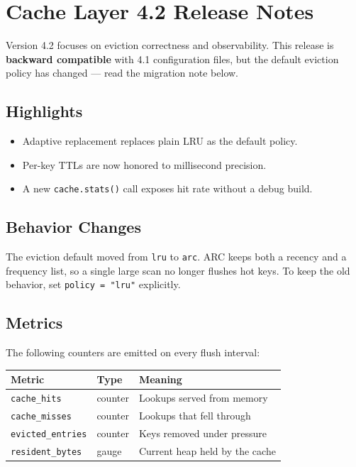 \documentclass[
]{article}
\author{}
\date{}
\newcounter{none} %
\providecommand{\tightlist}{%
  \setlength{\itemsep}{0pt}\setlength{\parskip}{0pt}}
\begin{document}
\section{Cache Layer 4.2 Release
Notes}\label{cache-layer-4.2-release-notes}

Version 4.2 focuses on eviction correctness and observability. This
release is \textbf{backward compatible} with 4.1 configuration files,
but the default eviction policy has changed --- read the migration note
below.

\subsection{Highlights}\label{highlights}

\begin{itemize}
\tightlist
\item
  Adaptive replacement replaces plain LRU as the default policy.
\item
  Per-key TTLs are now honored to millisecond precision.
\item
  A new \texttt{cache.stats()} call exposes hit rate without a debug
  build.
\end{itemize}

\subsection{Behavior Changes}\label{behavior-changes}

The eviction default moved from \texttt{lru} to \texttt{arc}. ARC keeps
both a recency and a frequency list, so a single large scan no longer
flushes hot keys. To keep the old behavior, set
\texttt{policy\ =\ "lru"} explicitly.

\subsection{Metrics}\label{metrics}

The following counters are emitted on every flush interval:

{\def\LTcaptype{none} %
\begin{longtable}[]{@{}lll@{}}
\toprule\noalign{}
Metric & Type & Meaning \\
\midrule\noalign{}
\endhead
\bottomrule\noalign{}
\endlastfoot
\texttt{cache\_hits} & counter & Lookups served from memory \\
\texttt{cache\_misses} & counter & Lookups that fell through \\
\texttt{evicted\_entries} & counter & Keys removed under pressure \\
\texttt{resident\_bytes} & gauge & Current heap held by the cache \\
\end{longtable}
}
\end{document}
